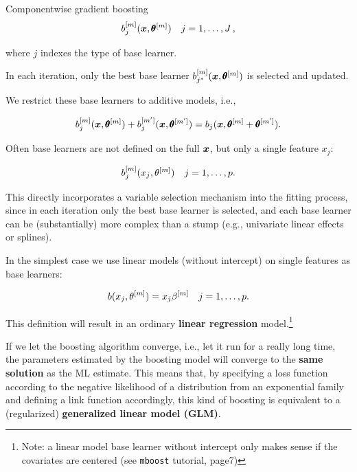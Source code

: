 \begin{vbframe}{Componentwise gradient boosting}
$$
  b_j^{[m]}(\bm{x},\pmb\theta^{[m]}) \quad j = 1,\dots, J\,,
$$

where $j$ indexes the type of base learner.

\lz

In each iteration, only the best base learner $b_{j^\ast}^{[m]}(\bm{x},\pmb\theta^{[m]})$ is selected and updated.

\framebreak

We restrict these base learners to additive models, i.e.,

$$
 b_j^{[m]}(\bm{x},\pmb\theta^{[m]}) + b_j^{[m^\prime]}(\bm{x},\pmb\theta^{[m^\prime]}) = b_j(\bm{x},\pmb\theta^{[m]} + \pmb\theta^{[m^\prime]}).
$$

\lz

Often base learners are not defined on the full $\bm{x}$, but only a single feature $x_j$:

$$
  b_j^{[m]}(x_j,\theta^{[m]}) \quad j = 1,\dots, p.
$$

\lz
This directly incorporates a variable selection mechanism into the fitting process,
since in each iteration only the best base learner is selected, and each base learner can be (substantially) more complex than a stump (e.g., univariate linear effects or splines).

\framebreak




\framebreak

In the simplest case we use linear models (without intercept) on single features as base learners:

$$
  b(x_j,\theta^{[m]}) = x_j\beta^{[m]} \quad j = 1,\dots,p.
$$

This definition will result in an ordinary \textbf{linear regression} model.\footnote{Note: a linear model base learner without intercept only makes sense if the covariates are centered (see \texttt{mboost} tutorial, page7)}

\lz

If we let the boosting algorithm converge, i.e., let it run for a really long time, the parameters estimated by the boosting model will converge to the \textbf{same solution} as the ML estimate. This means that, by specifying a loss function according to the negative likelihood of a distribution from an exponential family and defining a link function accordingly, this kind of boosting is equivalent to a (regularized) \textbf{generalized linear model (GLM)}.

\framebreak


\end{vbframe}

